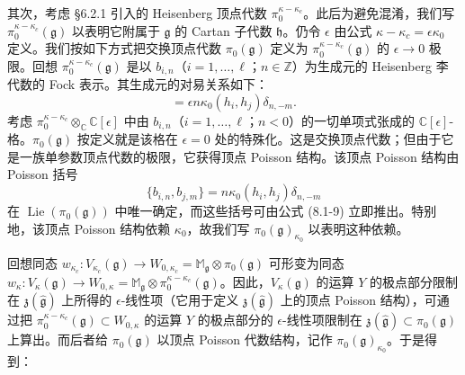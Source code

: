 其次，考虑 §6.2.1 引入的 Heisenberg 顶点代数 $\pi_0^{\kappa-\kappa_c}$。此后为避免混淆，我们写 $\pi_0^{\kappa-\kappa_c}(\mathfrak g)$ 以表明它附属于 $\mathfrak g$ 的 Cartan 子代数 $\mathfrak h$。仍令 $\epsilon$ 由公式 $\kappa-\kappa_c=\epsilon\kappa_0$ 定义。我们按如下方式把交换顶点代数 $\pi_0(\mathfrak g)$ 定义为 $\pi_0^{\kappa-\kappa_c}(\mathfrak g)$ 的 $\epsilon\to0$ 极限。回想 $\pi_0^{\kappa-\kappa_c}(\mathfrak g)$ 是以 $b_{i,n}$（$i=1,\dots,\ell$；$n\in\mathbb Z$）为生成元的 Heisenberg 李代数的 Fock 表示。其生成元的对易关系如下：
\begin{equation}
    [b_{i,n},b_{j,m}]=\epsilon n\kappa_0(h_i,h_j)\delta_{n,-m}.
    \tag{8.1-9}
\end{equation}
考虑 $\pi_0^{\kappa-\kappa_c}\otimes_{\mathbb C}\mathbb C[\epsilon]$ 中由 $b_{i,n}$（$i=1,\dots,\ell$；$n<0$）的一切单项式张成的 $\mathbb C[\epsilon]$-格。$\pi_0(\mathfrak g)$ 按定义就是该格在 $\epsilon=0$ 处的特殊化。这是交换顶点代数；但由于它是一族单参数顶点代数的极限，它获得顶点 Poisson 结构。该顶点 Poisson 结构由 Poisson 括号
\[
    \{b_{i,n},b_{j,m}\}=n\kappa_0(h_i,h_j)\delta_{n,-m}
\]
在 $\operatorname{Lie}(\pi_0(\mathfrak g))$ 中唯一确定，而这些括号可由公式 (8.1-9) 立即推出。特别地，该顶点 Poisson 结构依赖 $\kappa_0$，故我们写 $\pi_0(\mathfrak g)_{\kappa_0}$ 以表明这种依赖。


回想同态 $w_{\kappa_c}:V_{\kappa_c}(\mathfrak g)\to W_{0,\kappa_c}=\mathbb M_{\mathfrak g}\otimes\pi_0(\mathfrak g)$ 可形变为同态 $w_\kappa:V_\kappa(\mathfrak g)\to W_{0,\kappa}=\mathbb M_{\mathfrak g}\otimes\pi_0^{\kappa-\kappa_c}(\mathfrak g)$。因此，$V_\kappa(\mathfrak g)$ 的运算 $Y$ 的极点部分限制在 $\mathfrak z(\hat{\mathfrak g})$ 上所得的 $\epsilon$-线性项（它用于定义 $\mathfrak z(\hat{\mathfrak g})$ 上的顶点 Poisson 结构），可通过把 $\pi_0^{\kappa-\kappa_c}(\mathfrak g)\subset W_{0,\kappa}$ 的运算 $Y$ 的极点部分的 $\epsilon$-线性项限制在 $\mathfrak z(\hat{\mathfrak g})\subset\pi_0(\mathfrak g)$ 上算出。而后者给 $\pi_0(\mathfrak g)$ 以顶点 Poisson 代数结构，记作 $\pi_0(\mathfrak g)_{\kappa_0}$。于是得到：

